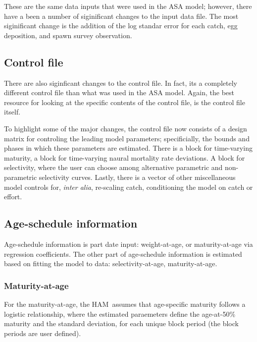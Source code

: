 \documentclass[12pt,letterpaper]{article}
\newcommand{\ham}{HAM}
\begin{document}
    These are the same data inputs that were used in the ASA model; however, there have a been a number of siginificant changes to the input data file.  The most siginificant change is the addition of the log standar error for each catch, egg deposition, and spawn survey observation.  

  \subsection{Control file} %
  \label{sub:control_file}
    There are also siginficant changes to the control file.  In fact, its a completely different control file than what was used in the ASA model.  Again, the best resource for looking at the specific contents of the control file, is the control file itself. 


    To highlight some of the major changes, the control file now consists of a design matrix for controling the leading model parameters; specificially, the bounds and phases in which these parameters are estimated.  There is a block for time-varying maturity, a block for time-varying naural mortality rate deviations.  A block for selectivity, where the user can choose among alternative parametric and non-parametric selectivity curves. Lastly, there is a vector of other miscellaneous model controls for, \textit{inter alia}, re-scaling catch, conditioning the model on catch or effort.  


  \subsection{Age-schedule information} %
  \label{sub:age_schedule_information}
    Age-schedule information is part date input: weight-at-age, or maturity-at-age via regression coefficients. The other part of age-schedule information is estimated based on fitting the model to data: selectivity-at-age, maturity-at-age.  

    \subsubsection{Maturity-at-age} %
    \label{ssub:maturity_at_age}
      For the maturity-at-age, the \ham\ assumes that age-specific maturity follows a logistic relationship, where the estimated paraemeters define the age-at-50\% maturity and the standard deviation, for each unique block period (the block periods are user defined). 
\end{document}
